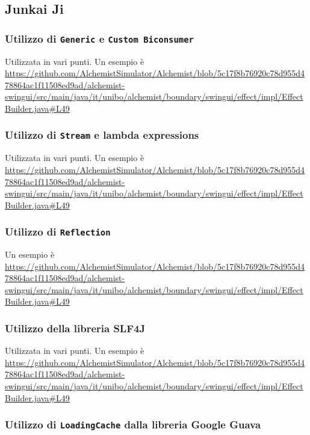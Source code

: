 \documentclass[a4paper,12pt]{report}
\begin{document}
\subsection{Junkai Ji}

\subsubsection{Utilizzo di \texttt{Generic} e \texttt{Custom Biconsumer}}
Utilizzata in vari punti.
Un esempio è \url{https://github.com/AlchemistSimulator/Alchemist/blob/5c17f8b76920c78d955d478864ac1f11508ed9ad/alchemist-swingui/src/main/java/it/unibo/alchemist/boundary/swingui/effect/impl/EffectBuilder.java#L49}

\subsubsection{Utilizzo di \texttt{Stream} e lambda expressions}
Utilizzata in vari punti.
Un esempio è 
\url{https://github.com/AlchemistSimulator/Alchemist/blob/5c17f8b76920c78d955d478864ac1f11508ed9ad/alchemist-swingui/src/main/java/it/unibo/alchemist/boundary/swingui/effect/impl/EffectBuilder.java#L49}

\subsubsection{Utilizzo di \texttt{Reflection}}
Un esempio è 
\url{https://github.com/AlchemistSimulator/Alchemist/blob/5c17f8b76920c78d955d478864ac1f11508ed9ad/alchemist-swingui/src/main/java/it/unibo/alchemist/boundary/swingui/effect/impl/EffectBuilder.java#L49}



	


	
	\subsubsection{Utilizzo della libreria SLF4J}
	
	Utilizzata in vari punti.
	Un esempio è \url{https://github.com/AlchemistSimulator/Alchemist/blob/5c17f8b76920c78d955d478864ac1f11508ed9ad/alchemist-swingui/src/main/java/it/unibo/alchemist/boundary/swingui/effect/impl/EffectBuilder.java#L49}
	
	\subsubsection{Utilizzo di \texttt{LoadingCache} dalla libreria Google Guava}
	
\end{document}
